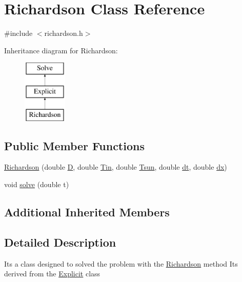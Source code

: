 \hypertarget{class_richardson}{}\section{Richardson Class Reference}
\label{class_richardson}


{\ttfamily \#include $<$richardson.\+h$>$}

Inheritance diagram for Richardson\+:\begin{figure}[H]
\begin{center}
\leavevmode
\includegraphics[height=3.000000cm]{class_richardson}
\end{center}
\end{figure}
\subsection*{Public Member Functions}
\begin{DoxyCompactItemize}
\item 
\hyperlink{class_richardson_ab669d2d69be9d899d5ca2bb7a7c33a5b}{Richardson} (double \hyperlink{class_solve_ab6b73352e9bca73bad1b133fc84f008c}{D}, double \hyperlink{class_solve_a324c747af91a26a206d7772853b8655e}{Tin}, double \hyperlink{class_solve_a7145536b49fb1ac4d2f36f800d118616}{Tsun}, double \hyperlink{class_solve_ac1befb9c006f895fb0517e19c412ca57}{dt}, double \hyperlink{class_solve_a21b9b8118f508e079f066d2ce2816dd1}{dx})
\item 
void \hyperlink{class_richardson_ab8dd2ff0e58c11092fead4d45a4f5c64}{solve} (double t)
\end{DoxyCompactItemize}
\subsection*{Additional Inherited Members}


\subsection{Detailed Description}
It\textquotesingle{}s a class designed to solved the problem with the \hyperlink{class_richardson}{Richardson} method It\textquotesingle{}s derived from the \hyperlink{class_explicit}{Explicit} class

